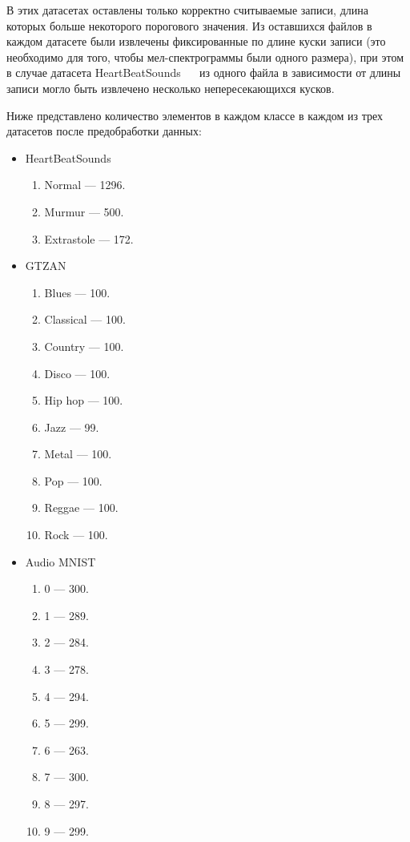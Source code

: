 \documentclass[12pt, fleqn]{article}
\begin{document}
В этих датасетах оставлены только корректно считываемые записи, длина которых больше некоторого порогового значения. Из оставшихся файлов в каждом датасете были извлечены фиксированные по длине куски записи (это необходимо для того, чтобы мел-спектрограммы были одного размера), при этом в случае датасета HeartBeatSounds ~\cite{HeartbeatSoundsArticle}~\cite{HeartbeatSoundsKaggle} из одного файла в зависимости от длины записи могло быть извлечено несколько непересекающихся кусков.

Ниже представлено количество элементов в каждом классе в каждом из трех датасетов после предобработки данных:

\begin{itemize}
    \item HeartBeatSounds ~\cite{HeartbeatSoundsArticle}~\cite{HeartbeatSoundsKaggle}
    \begin{enumerate}
        \item Normal --- 1296.
        \item Murmur --- 500.
        \item Extrastole --- 172.
    \end{enumerate}
    \item GTZAN ~\cite{GTZAN_Article}~\cite{GTZAN_kaggle}
    \begin{enumerate}
        \item Blues --- 100.
        \item Classical --- 100.
        \item Country --- 100.
        \item Disco --- 100.
        \item Hip hop --- 100.
        \item Jazz --- 99.
        \item Metal --- 100.
        \item Pop --- 100.
        \item Reggae --- 100.
        \item Rock --- 100.
    \end{enumerate}
    \item Audio MNIST ~\cite{AudioMnistArticle}~\cite{AudioMnistKaggle}
    \begin{enumerate}
        \item 0 --- 300.
        \item 1 --- 289.
        \item 2 --- 284.
        \item 3 --- 278.
        \item 4 --- 294.
        \item 5 --- 299.
        \item 6 --- 263.
        \item 7 --- 300.
        \item 8 --- 297.
        \item 9 --- 299.
    \end{enumerate}
\end{itemize}
\end{document}
